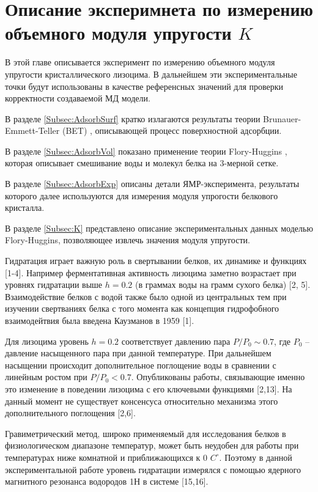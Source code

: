 \chapter{Описание эксперимнета по измерению объемного модуля упругости $K$}
\label{Sec:Exp}

В этой главе описывается эксперимент по измерению объемного модуля упругости кристаллического лизоцима. В дальнейшем эти экспериментальные точки будут использованы в качестве референсных значений для проверки корректности создаваемой МД модели. 

В разделе \ref{Subsec:AdsorbSurf} кратко излагаются результаты теории Brunauer-Emmett-Teller (BET) \cite{Boer1968}, описывающей процесс поверхностной адсорбции.

В разделе \ref{Subsec:AdsorbVol} показано применение теории Flory-Huggins \cite{Kuntz1974, Rowen1949}, которая описывает смешивание воды и молекул белка на 3-мерной сетке.

В разделе \ref{Subsec:AdsorbExp} описаны детали ЯМР-эксперимента, результаты которого далее используются для измерения модуля упрогости белкового кристалла.

В разделе \ref{Subsec:K} представлено описание экспериментальных данных моделью Flory-Huggins, позволяющее извлечь значения модуля упругости.

Гидратация играет важную роль в свертывании белков, их динамике и функциях [1-4]. Например ферментативная активность лизоцима заметно возрастает при уровнях гидратации выше $h = 0.2$ (в граммах воды на грамм сухого белка) [2, 5]. Взаимодействие белков с водой также было одной из центральных тем при изучении свертваниях белка с того момента как концепция гидрофобного взаимодейтвия была введена Каузманов в 1959 [1].

Для лизоцима уровень $h = 0.2$ соответствует давлению пара $P/P_0 \sim 0.7$, где $P_0$ -- давление насыщенного пара при данной температуре. При дальнейшем насыщении происходит дополнительное поглощение воды в сравнении с линейным ростом при $P/P_0 < 0.7$. Опубликованы работы, связывающие именно это изменение в поведении лизоцима с его ключевыми функциями [2,13]. На данный момент не существует консенсуса относительно механизма этого дополнительного поглощения [2,6]. 

Гравиметрический метод, широко применяемый для исследования белков в физиологическом диапазоне температур, может быть неудобен для работы при температурах ниже комнатной и приближающихся к 0 $C^{\circ}$. Поэтому в данной экспериментальной работе уровень гидратации измерялся с помощью ядерного магнитного резонанса водородов 1Н в системе [15,16].

